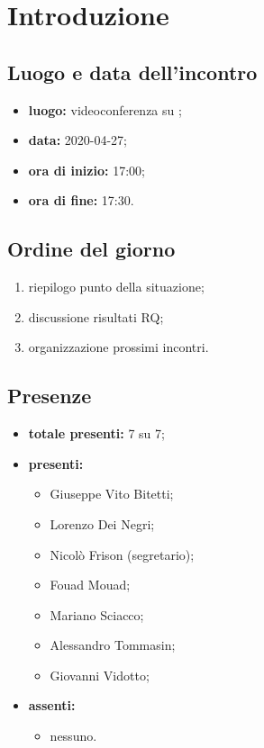 \section*{Introduzione}

\subsection*{Luogo e data dell'incontro}
	\begin{itemize}
		\item \textbf{luogo:} videoconferenza su ;
		\item \textbf{data:} 2020-04-27;
		\item \textbf{ora di inizio:} 17:00;
		\item \textbf{ora di fine:} 17:30.
	\end{itemize}

\subsection*{Ordine del giorno}
	\begin{enumerate}
			\item riepilogo punto della situazione;
			\item discussione risultati RQ;
			\item organizzazione prossimi incontri.
	\end{enumerate}

\subsection*{Presenze}
	\begin{itemize}
		\item \textbf{totale presenti:} 7 su 7;
		\item \textbf{presenti: }
			\begin{itemize}
				\item Giuseppe Vito Bitetti;
				\item Lorenzo Dei Negri;
				\item Nicolò Frison (segretario);
				\item Fouad Mouad;
				\item Mariano Sciacco;
				\item Alessandro Tommasin;
				\item Giovanni Vidotto;
			\end{itemize}
		\item \textbf{assenti: }
			\begin{itemize}
				\item nessuno.
			\end{itemize}
	\end{itemize}


